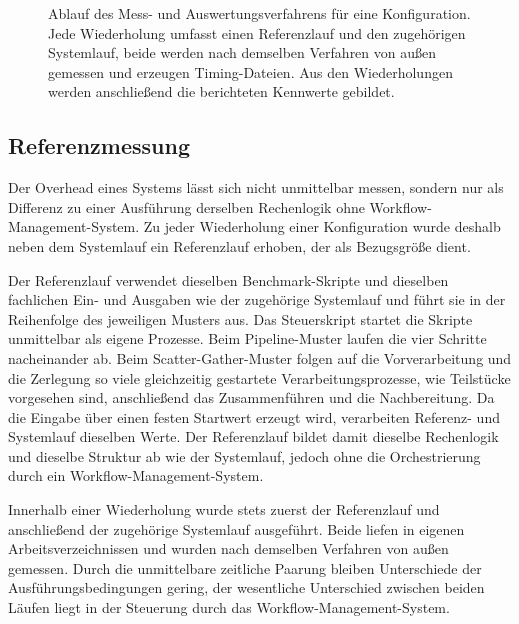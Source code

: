 \begin{figure}[H]
  \caption{Ablauf des Mess- und Auswertungsverfahrens für eine Konfiguration. Jede Wiederholung umfasst einen Referenzlauf und den zugehörigen Systemlauf, beide werden nach demselben Verfahren von außen gemessen und erzeugen Timing-Dateien. Aus den Wiederholungen werden anschließend die berichteten Kennwerte gebildet.}
  \label{fig:methodik:messung}
\end{figure}

\subsection{Referenzmessung}
\label{sec:methodik:referenz}

Der Overhead eines Systems lässt sich nicht unmittelbar messen,
sondern nur als Differenz zu einer Ausführung derselben Rechenlogik
ohne Workflow-Management-System. Zu jeder Wiederholung einer
Konfiguration wurde deshalb neben dem Systemlauf ein Referenzlauf
erhoben, der als Bezugsgröße dient.

Der Referenzlauf verwendet dieselben Benchmark-Skripte und dieselben
fachlichen Ein- und Ausgaben wie der zugehörige Systemlauf und führt
sie in der Reihenfolge des jeweiligen Musters aus. Das Steuerskript
startet die Skripte unmittelbar als eigene Prozesse. Beim Pipeline-Muster
laufen die vier Schritte nacheinander ab. Beim
Scatter-Gather-Muster folgen auf die Vorverarbeitung und die
Zerlegung so viele gleichzeitig gestartete Verarbeitungsprozesse,
wie Teilstücke vorgesehen sind, anschließend das Zusammenführen und
die Nachbereitung. Da die Eingabe über einen festen Startwert
erzeugt wird, verarbeiten Referenz- und Systemlauf dieselben Werte.
Der Referenzlauf bildet damit dieselbe Rechenlogik und dieselbe
Struktur ab wie der Systemlauf, jedoch ohne die Orchestrierung durch ein Workflow-Management-System.

Innerhalb einer Wiederholung wurde stets zuerst der Referenzlauf
und anschließend der zugehörige Systemlauf ausgeführt. Beide liefen
in eigenen Arbeitsverzeichnissen und wurden nach demselben
Verfahren von außen gemessen. Durch die unmittelbare zeitliche
Paarung bleiben Unterschiede der Ausführungsbedingungen gering, der
wesentliche Unterschied zwischen beiden Läufen liegt in der
Steuerung durch das Workflow-Management-System.


